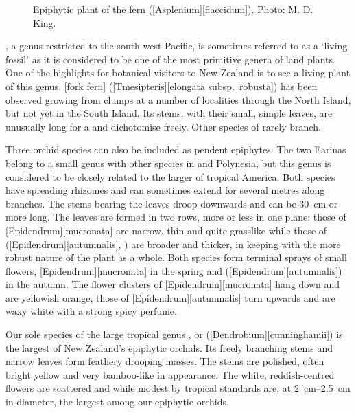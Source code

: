 \begin{figure}[!b]
\begin{minipage}[t]{0.7\textwidth}
\begin{minipage}[t]{(\textwidth-\fgap) * \real{0.436}}
			\caption[Epiphytic plant of the fern drooping spleenwort (\emph{Asplenium flaccidum})]{Epiphytic plant of the fern  ([Asplenium][flaccidum]).
			Photo: M. D. King.}%
			\label{fig:43asplenium-jlaccidum}
		\end{minipage}
	\end{minipage}
\end{figure}

, a genus restricted to the south west Pacific, is sometimes referred to as a `living fossil' as it is considered to be one of the most primitive genera of land plants.
One of the highlights for botanical visitors to New Zealand is to see a living plant of this genus.
[fork fern] ([Tmesipteris][elongata subsp.\ robusta]) has been observed growing from  clumps at a number of localities through the North Island, but not yet in the South Island.
Its stems, with their small, simple leaves, are unusually long for a  and dichotomise freely.
Other species of  rarely branch.

Three orchid species can also be included as pendent epiphytes.
The two Earinas belong to a small genus with other species in  and Polynesia, but this genus is considered to be closely related to the larger  of tropical America.
Both species have spreading rhizomes and can sometimes extend for several metres along branches.
The stems bearing the leaves droop downwards and can be \SI{30}{\centi\metre} or more long.
The leaves are formed in two rows, more or less in one plane; those of [Epidendrum][mucronata] are narrow, thin and quite grasslike while those of  ([Epidendrum][autumnalis], ) are broader and thicker, in keeping with the more robust nature of the plant as a whole.
Both species form terminal sprays of small flowers, [Epidendrum][mucronata] in the spring and  ([Epidendrum][autumnalis]) in the autumn.
The flower clusters of [Epidendrum][mucronata] hang down and are yellowish orange, those of [Epidendrum][autumnalis] turn upwards and are waxy white with a strong spicy perfume.

Our sole species of the large tropical genus ,  or  ([Dendrobium][cunninghamii]) is the largest of New Zealand's epiphytic orchids.
Its freely branching stems and narrow leaves form feathery drooping masses.
The stems are polished, often bright yellow and very bamboo-like in appearance.
The white, reddish-centred flowers are scattered and while modest by tropical standards are, at \SIrange{2}{2.5}{\centi\metre} in diameter, the largest among our epiphytic orchids.

